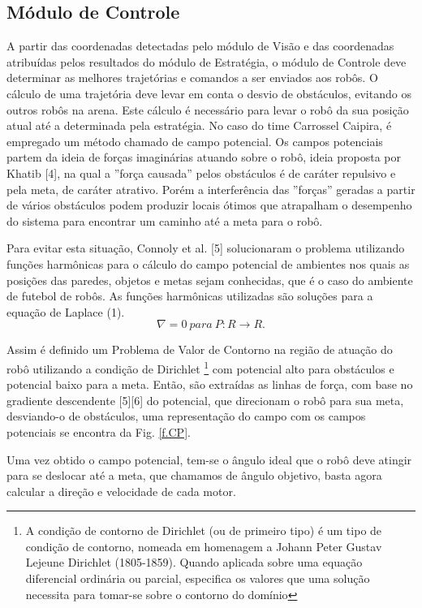 \subsection{Módulo de Controle}

A partir das coordenadas detectadas pelo módulo de Visão e das coordenadas atribuídas pelos resultados do módulo de Estratégia, o módulo de Controle deve determinar as melhores trajetórias e comandos a ser enviados aos robôs. O cálculo de uma trajetória deve levar em conta o desvio de obstáculos, evitando os outros robôs na arena. Este cálculo é necessário para levar o robô da sua posição atual até a determinada pela estratégia. No caso do time Carrossel Caipira, é empregado um método chamado de campo potencial. Os campos potenciais partem da ideia de forças imaginárias atuando sobre o robô, ideia proposta por Khatib [4], na qual a ''força causada'' pelos obstáculos é de caráter repulsivo e pela meta, de caráter atrativo. Porém a interferência das ''forças'' geradas a partir de vários obstáculos podem produzir locais
ótimos que atrapalham o desempenho do sistema para encontrar um caminho até a meta para o robô.

Para evitar esta situação, Connoly et al. [5] solucionaram o problema utilizando funções harmônicas para o cálculo do campo potencial de ambientes nos quais as posições das paredes, objetos e metas sejam conhecidas, que é o caso do ambiente de futebol de robôs. As funções harmônicas utilizadas são soluções para a equação de Laplace (1).
%
\begin{equation}
    \nabla = 0 \ para \ P : R \rightarrow R .
\end{equation}

Assim é definido um Problema de Valor de Contorno na região de atuação do robô utilizando a condição de Dirichlet%
%
\footnote{A condição de contorno de Dirichlet (ou de primeiro tipo) é um tipo de condição de contorno, nomeada em homenagem a Johann Peter Gustav Lejeune Dirichlet (1805-1859). Quando aplicada sobre uma equação diferencial ordinária ou parcial, especifica os valores que uma solução necessita para tomar-se sobre o contorno do domínio}
%
com potencial alto para obstáculos e potencial baixo para a meta. Então, são extraídas as linhas de força, com base no gradiente descendente [5][6] do potencial, que direcionam o robô para sua meta, desviando-o de obstáculos, uma representação do campo com os campos potenciais se encontra da Fig. \ref{f.CP}.

Uma vez obtido o campo potencial, tem-se o ângulo ideal que o robô deve atingir para se deslocar até a meta, que chamamos de ângulo objetivo, basta agora calcular a direção e velocidade de cada motor.


